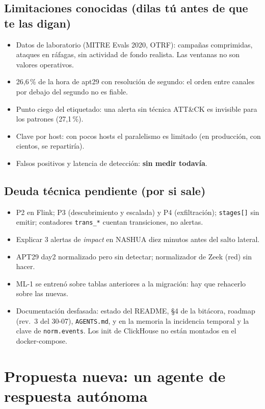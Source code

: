 \documentclass[11pt,a4paper]{article}
\newcommand{\cod}[1]{\texttt{#1}}
\begin{document}
\subsection*{Limitaciones conocidas (dilas tú antes de que te las digan)}
\begin{itemize}
  \item Datos de laboratorio (MITRE Evals 2020, OTRF): campañas comprimidas, ataques en ráfagas, sin actividad de
        fondo realista. Las ventanas no son valores operativos.
  \item 26,6\,\% de la hora de apt29 con resolución de segundo: el orden entre canales por debajo del segundo no es fiable.
  \item Punto ciego del etiquetado: una alerta sin técnica ATT\&CK es invisible para los patrones (27,1\,\%).
  \item Clave por host: con pocos hosts el paralelismo es limitado (en producción, con cientos, se repartiría).
  \item Falsos positivos y latencia de detección: \textbf{sin medir todavía}.
\end{itemize}

\subsection*{Deuda técnica pendiente (por si sale)}
\begin{itemize}
  \item P2 en Flink; P3 (descubrimiento y escalada) y P4 (exfiltración); \cod{stages[]} sin emitir; contadores
        \cod{trans\_*} cuentan transiciones, no alertas.
  \item Explicar 3 alertas de \textit{impact} en NASHUA diez minutos antes del salto lateral.
  \item APT29 day2 normalizado pero sin detectar; normalizador de Zeek (red) sin hacer.
  \item ML-1 se entrenó sobre tablas anteriores a la migración: hay que rehacerlo sobre las nuevas.
  \item Documentación desfasada: estado del README, §4 de la bitácora, roadmap (rev.\ 3 del 30-07), \cod{AGENTS.md},
        y en la memoria la incidencia temporal y la clave de \cod{norm.events}. Los init de ClickHouse no están
        montados en el docker-compose.
\end{itemize}

\newpage
\section{Propuesta nueva: un agente de respuesta autónoma}\label{sec:agente}
\end{document}

